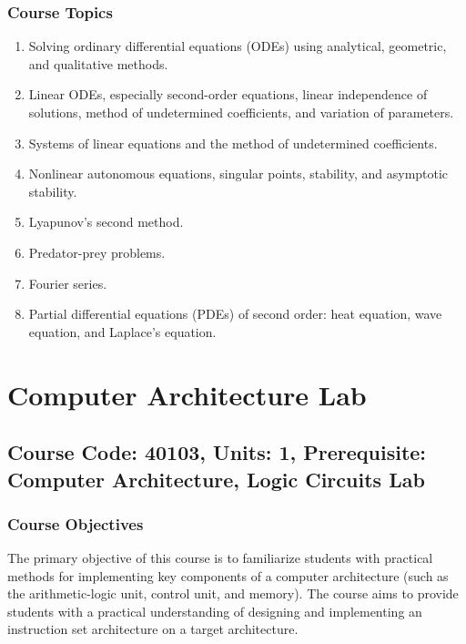 \documentclass[12pt]{article}
\begin{document}
\subsubsection*{Course Topics}
\begin{enumerate}
    \item Solving ordinary differential equations (ODEs) using analytical, geometric, and qualitative methods.
    \item Linear ODEs, especially second-order equations, linear independence of solutions, method of undetermined coefficients, and variation of parameters.
    \item Systems of linear equations and the method of undetermined coefficients.
    \item Nonlinear autonomous equations, singular points, stability, and asymptotic stability.
    \item Lyapunov's second method.
    \item Predator-prey problems.
    \item Fourier series.
    \item Partial differential equations (PDEs) of second order: heat equation, wave equation, and Laplace's equation.
\end{enumerate}
\newpage

\section{Computer Architecture Lab}
\subsection*{Course Code: 40103, Units: 1, Prerequisite: Computer Architecture, Logic Circuits Lab}

\subsubsection*{Course Objectives}
The primary objective of this course is to familiarize students with practical methods for implementing key components of a computer architecture (such as the arithmetic-logic unit, control unit, and memory). The course aims to provide students with a practical understanding of designing and implementing an instruction set architecture on a target architecture.
\end{document}
